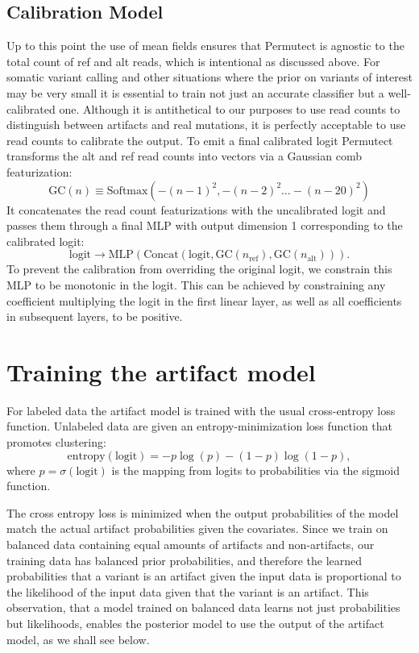 \documentclass[times, twoside, watermark]{StyleBioRxiv}
\begin{document}
\subsection*{Calibration Model} 
Up to this point the use of mean fields ensures that Permutect is agnostic to the total count of ref and alt reads, which is intentional as discussed above.  For somatic variant calling and other situations where the prior on variants of interest may be very small it is essential to train not just an accurate classifier but a well-calibrated one.  Although it is antithetical to our purposes to use read counts to distinguish between artifacts and real mutations, it is perfectly acceptable to use read counts to calibrate the output.  To emit a final calibrated logit Permutect transforms the alt and ref read counts into vectors via a Gaussian comb featurization:
\begin{equation}
    \mathrm{GC}(n) \equiv \mathrm{Softmax}\left( -(n-1)^2, -(n-2)^2 \dots -(n-20)^2 \right) 
\end{equation}
It concatenates the read count featurizations with the uncalibrated logit and passes them through a final MLP with output dimension 1 corresponding to the calibrated logit:
\begin{equation}
    \mathrm{logit} \rightarrow \mathrm{MLP}\left( \mathrm{Concat} \left( \mathrm{logit}, \mathrm{GC}(n_\mathrm{ref}), \mathrm{GC}(n_\mathrm{alt}) \right) \right).
\end{equation}
To prevent the calibration from overriding the original logit, we constrain this MLP to be monotonic in the logit.  This can be achieved by constraining any coefficient multiplying the logit in the first linear layer, as well as all coefficients in subsequent layers, to be positive.

\section*{Training the artifact model}
For labeled data the artifact model is trained with the usual cross-entropy loss function.  Unlabeled data are given an entropy-minimization loss function that promotes clustering:
\begin{equation}
    \mathrm{entropy}(\mathrm{logit}) = -p \log(p) - (1-p) \log(1-p),
\end{equation}
where $p = \sigma(\mathrm{logit})$ is the mapping from logits to probabilities via the sigmoid function.

The cross entropy loss is minimized when the output probabilities of the model match the actual artifact probabilities given the covariates.  Since we train on balanced data containing equal amounts of artifacts and non-artifacts, our training data has balanced prior probabilities, and therefore the learned probabilities that a variant is an artifact given the input data is proportional to the likelihood of the input data given that the variant is an artifact.  This observation, that a model trained on balanced data learns not just probabilities but likelihoods, enables the posterior model to use the output of the artifact model, as we shall see below.
\end{document}
